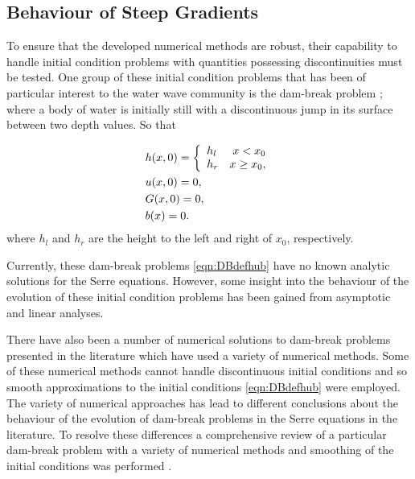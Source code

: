 \subsection{Behaviour of Steep Gradients}
To ensure that the developed numerical methods are robust, their capability to handle initial condition problems with quantities possessing discontinuities must be tested. One group of these initial condition problems that has been of particular interest to the water wave community is the dam-break problem \cite{El-etal-2006,Hank-etal-2010-2034,Mitsotakis-etal-2014,Mitsotakis-etal-2017,doCarmo-etal-2018-404}; where a body of water is initially still with a discontinuous jump in its surface between two depth values. So that

\begin{subequations}
	\begin{align}
	&h(x,0) =\left\lbrace \begin{array}{l r}
	h_l & x < x_0 \\
	h_r & x \ge x_0,
	\end{array} \right. \\
	&u(x,0) = 0 , \\
	&G(x,0) = 0 , \\
	&b(x) = 0.
	\end{align}
	\label{eqn:DBdefhub}
\end{subequations} 
where $h_l$ and $h_r$ are the height to the left and right of $x_0$, respectively. 

Currently, these dam-break problems \eqref{eqn:DBdefhub} have no known analytic solutions for the Serre equations. However, some insight into the behaviour of the evolution of these initial condition problems has been gained from asymptotic \cite{El-etal-2006} and linear \cite{Dougalis-etal-2007} analyses. 

There have also been a number of numerical solutions to dam-break problems presented in the literature \cite{El-etal-2006,Hank-etal-2010-2034,Mitsotakis-etal-2014,Mitsotakis-etal-2017,doCarmo-etal-2018-404} which have used a variety of numerical methods. Some of these numerical methods cannot handle discontinuous initial conditions \cite{El-etal-2006,Mitsotakis-etal-2014,Mitsotakis-etal-2017,doCarmo-etal-2018-404} and so smooth approximations to the initial conditions \eqref{eqn:DBdefhub} were employed. The variety of numerical approaches has lead to different conclusions about the behaviour of the evolution of dam-break problems in the Serre equations in the literature. To resolve these differences a comprehensive review of a particular dam-break problem with a variety of numerical methods and smoothing of the initial conditions was performed \cite{Pitt-2018-61}. 

